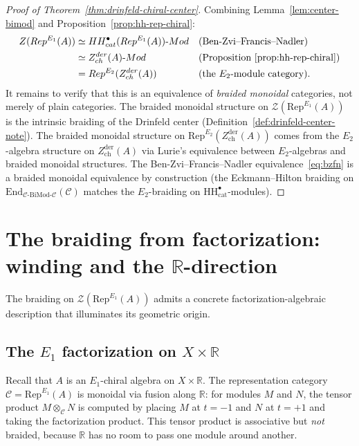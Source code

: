 \documentclass[11pt]{article}
\theoremstyle{definition}
\theoremstyle{remark}
\newcommand{\Mod}{\mathrm{Mod}}
\newcommand{\Rep}{\mathrm{Rep}}
\newcommand{\HH}{\mathrm{HH}}
\newcommand{\End}{\mathrm{End}}
\newcommand{\cC}{\mathcal{C}}
\newcommand{\cZ}{\mathcal{Z}}
\newcommand{\Zder}{Z^{\mathrm{der}}_{\mathrm{ch}}}
\newcommand{\BiMod}{\mathrm{BiMod}}
\begin{document}
\begin{proof}[Proof of Theorem~\ref{thm:drinfeld-chiral-center}]
Combining Lemma~\ref{lem:center-bimod} and Proposition~\ref{prop:hh-rep-chiral}:
\begin{align*}
 \cZ(\Rep^{E_1}(A))
 &\simeq \HH^\bullet_{\mathrm{cat}}(\Rep^{E_1}(A))\text{-}\Mod
 && \text{(Ben-Zvi--Francis--Nadler)} \\
 &\simeq \Zder(A)\text{-}\Mod
 && \text{(Proposition~\ref{prop:hh-rep-chiral})} \\
 &= \Rep^{E_2}(\Zder(A))
 && \text{(the $E_2$-module category).}
\end{align*}
It remains to verify that this is an equivalence of \emph{braided monoidal} categories, not merely of plain categories. The braided monoidal structure on $\cZ(\Rep^{E_1}(A))$ is the intrinsic braiding of the Drinfeld center (Definition~\ref{def:drinfeld-center-note}). The braided monoidal structure on $\Rep^{E_2}(\Zder(A))$ comes from the $E_2$-algebra structure on $\Zder(A)$ via Lurie's equivalence between $E_2$-algebras and braided monoidal structures. The Ben-Zvi--Francis--Nadler equivalence~\eqref{eq:bzfn} is a braided monoidal equivalence by construction (the Eckmann--Hilton braiding on $\End_{\cC\text{-}\BiMod\text{-}\cC}(\cC)$ matches the $E_2$-braiding on $\HH^\bullet_{\mathrm{cat}}$-modules).
\end{proof}


\section{The braiding from factorization: winding and the $\mathbb{R}$-direction}
\label{sec:braiding}

The braiding on $\cZ(\Rep^{E_1}(A))$ admits a concrete factorization-algebraic description that illuminates its geometric origin.

\subsection{The $E_1$ factorization on $X \times \mathbb{R}$}

Recall that $A$ is an $E_1$-chiral algebra on $X \times \mathbb{R}$. The representation category $\cC = \Rep^{E_1}(A)$ is monoidal via fusion along $\mathbb{R}$: for modules $M$ and $N$, the tensor product $M \otimes_\cC N$ is computed by placing $M$ at $t = -1$ and $N$ at $t = +1$ and taking the factorization product. This tensor product is associative but \emph{not} braided, because $\mathbb{R}$ has no room to pass one module around another.
\end{document}
